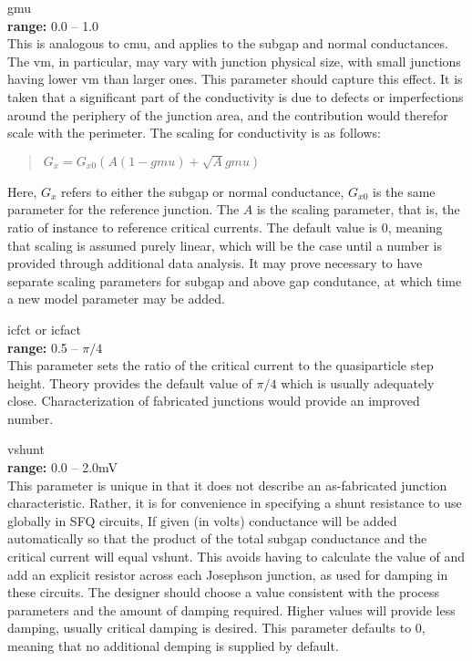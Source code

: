 \begin{description}
\item{\vt gmu}\\
{\bf range:} 0.0 -- 1.0\\
This is analogous to {\vt cmu}, and applies to the subgap and normal
conductances.  The {\vt vm}, in particular, may vary with junction
physical size, with small junctions having lower {\vt vm} than larger
ones.  This parameter should capture this effect.  It is taken that a
significant part of the conductivity is due to defects or
imperfections around the periphery of the junction area, and the
contribution would therefor scale with the perimeter.  The scaling for
conductivity is as follows:
\begin{quote}
$G_x = G_{x0} (A(1-gmu) + \sqrt{A} gmu)$
\end{quote}
Here, $G_x$ refers to either the subgap or normal conductance,
$G_{x0}$ is the same parameter for the reference junction.  The $A$ is
the scaling parameter, that is, the ratio of instance to reference
critical currents.  The default value is 0, meaning that scaling is
assumed purely linear, which will be the case until a number is
provided through additional data analysis.  It may prove necessary to
have separate scaling parameters for subgap and above gap condutance,
at which time a new model parameter may be added.

\item{{\vt icfct} or {\vt icfact}}\\
{\bf range:} 0.5 -- ${\pi}/4$\\
This parameter sets the ratio of the critical current to the
quasiparticle step height.  Theory provides the default value of
$\pi/4$ which is usually adequately close.  Characterization of
fabricated junctions would provide an improved number.

\item{\vt vshunt}\\
{\bf range:} 0.0 -- 2.0mV\\
This parameter is unique in that it does not describe an as-fabricated
junction characteristic.  Rather, it is for convenience in specifying
a shunt resistance to use globally in SFQ circuits, If given (in
volts) conductance will be added automatically so that the product of
the total subgap conductance and the critical current will equal {\vt
vshunt}.  This avoids having to calculate the value of and add an
explicit resistor across each Josephson junction, as used for damping
in these circuits.  The designer should choose a value consistent with
the process parameters and the amount of damping required.  Higher
values will provide less damping, usually critical damping is desired. 
This parameter defaults to 0, meaning that no additional demping is
supplied by default.


\end{description}
